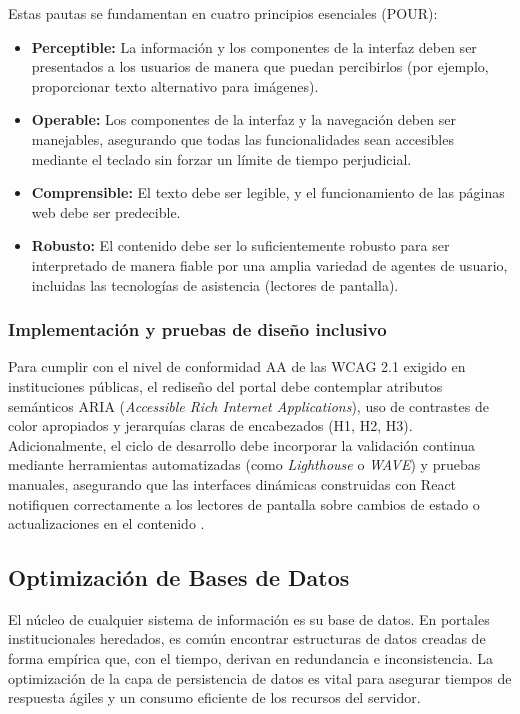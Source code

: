 Estas pautas se fundamentan en cuatro principios esenciales (POUR):
\begin{itemize}
    \item \textbf{Perceptible:} La información y los componentes de la interfaz deben ser presentados a los usuarios de manera que puedan percibirlos (por ejemplo, proporcionar texto alternativo para imágenes).
    \item \textbf{Operable:} Los componentes de la interfaz y la navegación deben ser manejables, asegurando que todas las funcionalidades sean accesibles mediante el teclado sin forzar un límite de tiempo perjudicial.
    \item \textbf{Comprensible:} El texto debe ser legible, y el funcionamiento de las páginas web debe ser predecible.
    \item \textbf{Robusto:} El contenido debe ser lo suficientemente robusto para ser interpretado de manera fiable por una amplia variedad de agentes de usuario, incluidas las tecnologías de asistencia (lectores de pantalla).
\end{itemize}

\subsubsection*{Implementación y pruebas de diseño inclusivo}

Para cumplir con el nivel de conformidad AA de las WCAG 2.1 exigido en instituciones públicas, el rediseño del portal debe contemplar atributos semánticos ARIA (\textit{Accessible Rich Internet Applications}), uso de contrastes de color apropiados y jerarquías claras de encabezados (H1, H2, H3). Adicionalmente, el ciclo de desarrollo debe incorporar la validación continua mediante herramientas automatizadas (como \textit{Lighthouse} o \textit{WAVE}) y pruebas manuales, asegurando que las interfaces dinámicas construidas con React notifiquen correctamente a los lectores de pantalla sobre cambios de estado o actualizaciones en el contenido \cite{w3c2024evaluate}.

\subsection{Optimización de Bases de Datos}
\label{sec:optimizacion_bd}

El núcleo de cualquier sistema de información es su base de datos. En portales institucionales heredados, es común encontrar estructuras de datos creadas de forma empírica que, con el tiempo, derivan en redundancia e inconsistencia. La optimización de la capa de persistencia de datos es vital para asegurar tiempos de respuesta ágiles y un consumo eficiente de los recursos del servidor.

